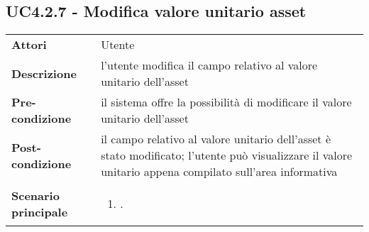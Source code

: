 \subsection{UC4.2.7 - Modifica valore unitario asset} 
\label{sssec:UC4.2.7} 
\def\arraystretch{1.5}
\begin{tabularx}{\textwidth}{l|p{}}
	\rowcolor{I} \multicolumn{2}{c}{\color{white}\textbf{UC4.2.7 - Modifica valore unitario asset}} \\
	\toprule
	\endhead
	\textbf{Attori} & Utente\\
	\textbf{Descrizione} & l'utente modifica il campo relativo al valore unitario dell'asset\\
	\textbf{Pre-condizione} & il sistema offre la possibilità di modificare il valore unitario dell'asset\\
	\textbf{Post-condizione} & il campo relativo al valore unitario dell'asset è stato modificato; l'utente può visualizzare il valore unitario appena compilato sull'area informativa\\
	\textbf{Scenario principale} & \vspace{-1.2em}\begin{enumerate}[leftmargin=*,noitemsep,nosep]
		\item \nameref{sssec:UC4.2.7}.
	\end{enumerate}\\
	\bottomrule
\end{tabularx}

